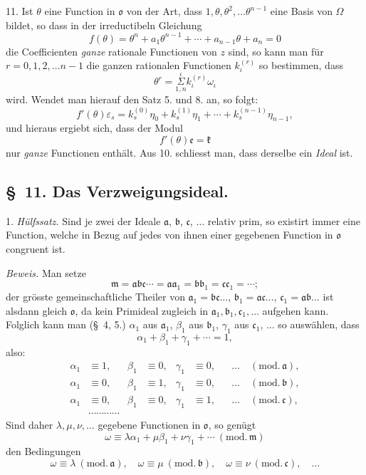 \documentclass{article}
\begin{document}

11. Ist $\theta$ eine Function in $\mathfrak{o}$ von der Art, dass $1, \theta, \theta^{2}, \ldots \theta^{n-1}$ eine Basis von $\Omega$ bildet, so dass in der irreductibeln Gleichung
\[ f(\theta) = \theta^{n} + a_{1}\theta^{n-1} + \cdots + a_{n-1}\theta + a_{n} = 0 \]
die Coefficienten \emph{ganze} rationale Functionen von $z$ sind, so kann man für $r = 0, 1, 2, \ldots n-1$ die ganzen rationalen Functionen $k_{\iota}^{(r)}$ so bestimmen, dass
\[ \theta^{r} = \overset{\iota}{\underset{1,n}{\Sigma}} k_{\iota}^{(r)}\omega_{\iota} \]
wird. Wendet man hierauf den Satz 5. und 8. an, so folgt:
\[ f'(\theta)\varepsilon_{s} = k_{s}^{(0)}\eta_{0} + k_{s}^{(1)}\eta_{1} + \cdots + k_{s}^{(n-1)}\eta_{n-1}, \]
und hieraus ergiebt sich, dass der Modul
\[ f'(\theta)\mathfrak{e} = \mathfrak{k} \]
nur \emph{ganze} Functionen enthält. Aus 10. schliesst man, dass derselbe ein \emph{Ideal} ist.

\subsection*{§~11. Das Verzweigungsideal.}

1. \emph{Hülfssatz.} Sind je zwei der Ideale $\mathfrak{a}$, $\mathfrak{b}$, $\mathfrak{c}$, $\ldots$ relativ prim, so existirt immer eine Function, welche in Bezug auf jedes von ihnen einer gegebenen Function in $\mathfrak{o}$ congruent ist.

\emph{Beweis.} Man setze
\[ \mathfrak{m} = \mathfrak{a}\mathfrak{b}\mathfrak{c}\cdots = \mathfrak{a}\mathfrak{a}_{1} = \mathfrak{b}\mathfrak{b}_{1} = \mathfrak{c}\mathfrak{c}_{1} = \cdots; \]
der grösste gemeinschaftliche Theiler von $\mathfrak{a}_{1} = \mathfrak{b}\mathfrak{c}\ldots$, $\mathfrak{b}_{1} = \mathfrak{a}\mathfrak{c}\ldots$, $\mathfrak{c}_{1} = \mathfrak{a}\mathfrak{b}\ldots$ ist alsdann gleich $\mathfrak{o}$, da kein Primideal zugleich in $\mathfrak{a}_{1}, \mathfrak{b}_{1}, \mathfrak{c}_{1}, \ldots$ aufgehen kann. Folglich kann man (§~4, 5.) $\alpha_{1}$ aus $\mathfrak{a}_{1}$, $\beta_{1}$ aus $\mathfrak{b}_{1}$, $\gamma_{1}$ aus $\mathfrak{c}_{1}$, $\ldots$ so auswählen, dass
\[ \alpha_{1} + \beta_{1} + \gamma_{1} + \cdots = 1, \]
also:
\[ \begin{aligned} \alpha_{1} &\equiv 1, & \beta_{1} &\equiv 0, & \gamma_{1} &\equiv 0, & &\ldots \quad (\text{mod.}\,\mathfrak{a}), \\ \alpha_{1} &\equiv 0, & \beta_{1} &\equiv 1, & \gamma_{1} &\equiv 0, & &\ldots \quad (\text{mod.}\,\mathfrak{b}), \\ \alpha_{1} &\equiv 0, & \beta_{1} &\equiv 0, & \gamma_{1} &\equiv 1, & &\ldots \quad (\text{mod.}\,\mathfrak{c}), \\ &\cdots\cdots\cdots\cdots \end{aligned} \]
Sind daher $\lambda, \mu, \nu, \ldots$ gegebene Functionen in $\mathfrak{o}$, so genügt
\[ \omega \equiv \lambda\alpha_{1} + \mu\beta_{1} + \nu\gamma_{1} + \cdots \ (\text{mod.}\,\mathfrak{m}) \]
den Bedingungen
\[ \omega \equiv \lambda \ (\text{mod.}\,\mathfrak{a}), \quad \omega \equiv \mu \ (\text{mod.}\,\mathfrak{b}), \quad \omega \equiv \nu \ (\text{mod.}\,\mathfrak{c}), \quad \ldots \]
\end{document}
